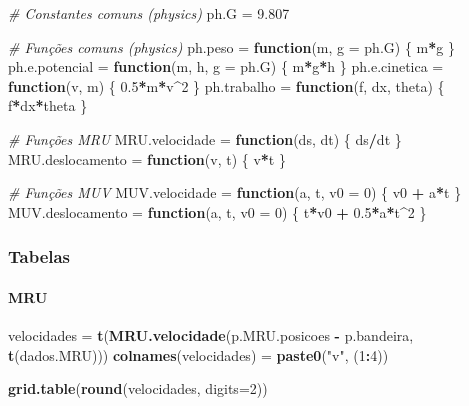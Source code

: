 \documentclass[]{article}
\newenvironment{Shaded}{\begin{snugshade}}{\end{snugshade}}
\newcommand{\KeywordTok}[1]{\textcolor[rgb]{0.13,0.29,0.53}{\textbf{#1}}}
\newcommand{\DataTypeTok}[1]{\textcolor[rgb]{0.13,0.29,0.53}{#1}}
\newcommand{\DecValTok}[1]{\textcolor[rgb]{0.00,0.00,0.81}{#1}}
\newcommand{\FloatTok}[1]{\textcolor[rgb]{0.00,0.00,0.81}{#1}}
\newcommand{\StringTok}[1]{\textcolor[rgb]{0.31,0.60,0.02}{#1}}
\newcommand{\CommentTok}[1]{\textcolor[rgb]{0.56,0.35,0.01}{\textit{#1}}}
\newcommand{\ControlFlowTok}[1]{\textcolor[rgb]{0.13,0.29,0.53}{\textbf{#1}}}
\newcommand{\OperatorTok}[1]{\textcolor[rgb]{0.81,0.36,0.00}{\textbf{#1}}}
\newcommand{\NormalTok}[1]{#1}
\let\oldparagraph\paragraph
\renewcommand{\paragraph}[1]{\oldparagraph{#1}\mbox{}}
\begin{document}
\begin{Shaded}
\begin{Highlighting}[]
\CommentTok{# Constantes comuns (physics)}
\NormalTok{ph.G =}\StringTok{ }\FloatTok{9.807}

\CommentTok{# Funções comuns (physics)}
\NormalTok{ph.peso =}\StringTok{ }\ControlFlowTok{function}\NormalTok{(m, }\DataTypeTok{g =}\NormalTok{ ph.G) \{ m}\OperatorTok{*}\NormalTok{g \}}
\NormalTok{ph.e.potencial =}\StringTok{ }\ControlFlowTok{function}\NormalTok{(m, h, }\DataTypeTok{g =}\NormalTok{ ph.G) \{ m}\OperatorTok{*}\NormalTok{g}\OperatorTok{*}\NormalTok{h \}}
\NormalTok{ph.e.cinetica =}\StringTok{ }\ControlFlowTok{function}\NormalTok{(v, m) \{ }\FloatTok{0.5}\OperatorTok{*}\NormalTok{m}\OperatorTok{*}\NormalTok{v}\OperatorTok{^}\DecValTok{2}\NormalTok{ \}}
\NormalTok{ph.trabalho =}\StringTok{ }\ControlFlowTok{function}\NormalTok{(f, dx, theta) \{ f}\OperatorTok{*}\NormalTok{dx}\OperatorTok{*}\NormalTok{theta \}}

\CommentTok{# Funções MRU}
\NormalTok{MRU.velocidade =}\StringTok{ }\ControlFlowTok{function}\NormalTok{(ds, dt) \{ ds}\OperatorTok{/}\NormalTok{dt \}}
\NormalTok{MRU.deslocamento =}\StringTok{ }\ControlFlowTok{function}\NormalTok{(v, t) \{ v}\OperatorTok{*}\NormalTok{t \}}

\CommentTok{# Funções MUV}
\NormalTok{MUV.velocidade =}\StringTok{ }\ControlFlowTok{function}\NormalTok{(a, t, }\DataTypeTok{v0 =} \DecValTok{0}\NormalTok{) \{ v0 }\OperatorTok{+}\StringTok{ }\NormalTok{a}\OperatorTok{*}\NormalTok{t \}}
\NormalTok{MUV.deslocamento =}\StringTok{ }\ControlFlowTok{function}\NormalTok{(a, t, }\DataTypeTok{v0 =} \DecValTok{0}\NormalTok{) \{ t}\OperatorTok{*}\NormalTok{v0 }\OperatorTok{+}\StringTok{ }\FloatTok{0.5}\OperatorTok{*}\NormalTok{a}\OperatorTok{*}\NormalTok{t}\OperatorTok{^}\DecValTok{2}\NormalTok{ \}}
\end{Highlighting}
\end{Shaded}

\subsubsection{Tabelas}\label{tabelas}

\paragraph{MRU}\label{mru}

\begin{Shaded}
\begin{Highlighting}[]
\NormalTok{velocidades =}\StringTok{ }\KeywordTok{t}\NormalTok{(}\KeywordTok{MRU.velocidade}\NormalTok{(p.MRU.posicoes }\OperatorTok{-}\StringTok{ }\NormalTok{p.bandeira, }\KeywordTok{t}\NormalTok{(dados.MRU)))}
\KeywordTok{colnames}\NormalTok{(velocidades) =}\StringTok{ }\KeywordTok{paste0}\NormalTok{(}\StringTok{"v"}\NormalTok{, (}\DecValTok{1}\OperatorTok{:}\DecValTok{4}\NormalTok{))}

\KeywordTok{grid.table}\NormalTok{(}\KeywordTok{round}\NormalTok{(velocidades, }\DataTypeTok{digits=}\DecValTok{2}\NormalTok{))}
\end{Highlighting}
\end{Shaded}
\end{document}
